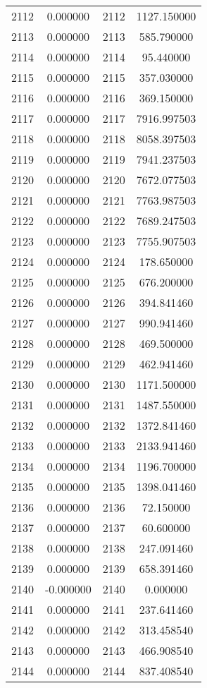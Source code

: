 \documentclass[12pt]{article}
\begin{document}
\begin{longtable}{@{}cccc@{}}
2112 & 0.000000 & 2112 & 1127.150000 \\
2113 & 0.000000 & 2113 & 585.790000 \\
2114 & 0.000000 & 2114 & 95.440000 \\
2115 & 0.000000 & 2115 & 357.030000 \\
2116 & 0.000000 & 2116 & 369.150000 \\
2117 & 0.000000 & 2117 & 7916.997503 \\
2118 & 0.000000 & 2118 & 8058.397503 \\
2119 & 0.000000 & 2119 & 7941.237503 \\
2120 & 0.000000 & 2120 & 7672.077503 \\
2121 & 0.000000 & 2121 & 7763.987503 \\
2122 & 0.000000 & 2122 & 7689.247503 \\
2123 & 0.000000 & 2123 & 7755.907503 \\
2124 & 0.000000 & 2124 & 178.650000 \\
2125 & 0.000000 & 2125 & 676.200000 \\
2126 & 0.000000 & 2126 & 394.841460 \\
2127 & 0.000000 & 2127 & 990.941460 \\
2128 & 0.000000 & 2128 & 469.500000 \\
2129 & 0.000000 & 2129 & 462.941460 \\
2130 & 0.000000 & 2130 & 1171.500000 \\
2131 & 0.000000 & 2131 & 1487.550000 \\
2132 & 0.000000 & 2132 & 1372.841460 \\
2133 & 0.000000 & 2133 & 2133.941460 \\
2134 & 0.000000 & 2134 & 1196.700000 \\
2135 & 0.000000 & 2135 & 1398.041460 \\
2136 & 0.000000 & 2136 & 72.150000 \\
2137 & 0.000000 & 2137 & 60.600000 \\
2138 & 0.000000 & 2138 & 247.091460 \\
2139 & 0.000000 & 2139 & 658.391460 \\
2140 & -0.000000 & 2140 & 0.000000 \\
2141 & 0.000000 & 2141 & 237.641460 \\
2142 & 0.000000 & 2142 & 313.458540 \\
2143 & 0.000000 & 2143 & 466.908540 \\
2144 & 0.000000 & 2144 & 837.408540 \\

\end{longtable}
\end{document}
